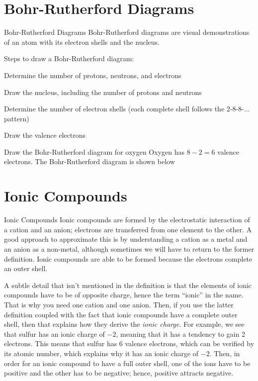 \documentclass[12pt]{report}
\begin{document}
\newpage
\section{Bohr-Rutherford Diagrams}
\begin{definition}{Bohr-Rutherford Diagrams}
    Bohr-Rutherford diagrams are visual demonstrations of an atom with its electron shells and the nucleus. 
\end{definition}
Steps to draw a Bohr-Rutherford diagram: 

\begin{list0.5}
    \item{Determine the number of protons, neutrons, and electrons}
    \item{Draw the nucleus, including the number of protons and neutrons}
    \item{Determine the number of electron shells (each complete shell follows the 2-8-8-... pattern)}
    \item{Draw the valence electrons}
\end{list0.5}

\begin{example}{Draw the Bohr-Rutherford diagram for oxygen}
    Oxygen has $8-2=6$ valence electrons. The Bohr-Rutherford diagram is shown below 
    \begin{center}
    \end{center}
\end{example}

\newpage
\section{Ionic Compounds}
\begin{definition}{Ionic Compounds}
Ionic compounds are formed by the electrostatic interaction of a cation and an anion; electrons are transferred from one element to the other. A good approach to approximate this is by understanding a cation as a metal and an anion as a non-metal, although sometimes we will have to return to the former definition. Ionic compounds are able to be formed because the electrons complete an outer shell.
\end{definition}

\begin{note}{ }
A subtle detail that isn't mentioned in the definition is that the elements of ionic compounds have to be of opposite charge, hence the term ``ionic'' in the name. That is why you need one cation and one anion. Then, if you use the latter definition coupled with the fact that ionic compounds have a complete outer shell, then that explains how they derive the \textit{ionic charge.} For example, we see that sulfur has an ionic charge of $-2$, meaning that it has a tendency to gain 2 electrons. This means that sulfur has 6 valence electrons, which can be verified by its atomic number, which explains why it has an ionic charge of $-2$. Then, in order for an ionic compound to have a full outer shell, one of the ions have to be positive and the other has to be negative; hence, positive attracts negative. 
\end{note}
\end{document}
